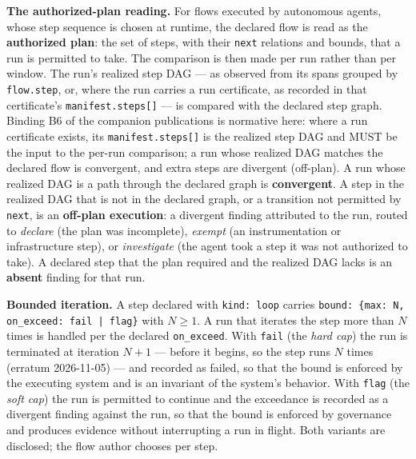 \documentclass[11pt]{article}
\newcommand{\code}[1]{\texttt{#1}}
\begin{document}
\textbf{The authorized-plan reading.} For flows executed by autonomous agents, whose step sequence is chosen at runtime, the declared flow is read as the \textbf{authorized plan}: the set of steps, with their \code{next} relations and bounds, that a run is permitted to take. The comparison is then made per run rather than per window. The run's realized step DAG --- as observed from its spans grouped by \code{flow.step}, or, where the run carries a run certificate, as recorded in that certificate's \code{manifest.steps[]} --- is compared with the declared step graph. Binding B6 of the companion publications is normative here: where a run certificate exists, its \code{manifest.steps[]} is the realized step DAG and MUST be the input to the per-run comparison; a run whose realized DAG matches the declared flow is convergent, and extra steps are divergent (off-plan). A run whose realized DAG is a path through the declared graph is \textbf{convergent}. A step in the realized DAG that is not in the declared graph, or a transition not permitted by \code{next}, is an \textbf{off-plan execution}: a divergent finding attributed to the run, routed to \emph{declare} (the plan was incomplete), \emph{exempt} (an instrumentation or infrastructure step), or \emph{investigate} (the agent took a step it was not authorized to take). A declared step that the plan required and the realized DAG lacks is an \textbf{absent} finding for that run.

\textbf{Bounded iteration.} A step declared with \code{kind: loop} carries \code{bound: \{max: N, on\_exceed: fail | flag\}} with \(N \geq 1\). A run that iterates the step more than \(N\) times is handled per the declared \code{on\_exceed}. With \code{fail} (the \emph{hard cap}) the run is terminated at iteration \(N+1\) --- before it begins, so the step runs \(N\) times (erratum 2026-11-05) --- and recorded as failed, so that the bound is enforced by the executing system and is an invariant of the system's behavior. With \code{flag} (the \emph{soft cap}) the run is permitted to continue and the exceedance is recorded as a divergent finding against the run, so that the bound is enforced by governance and produces evidence without interrupting a run in flight. Both variants are disclosed; the flow author chooses per step.
\end{document}
